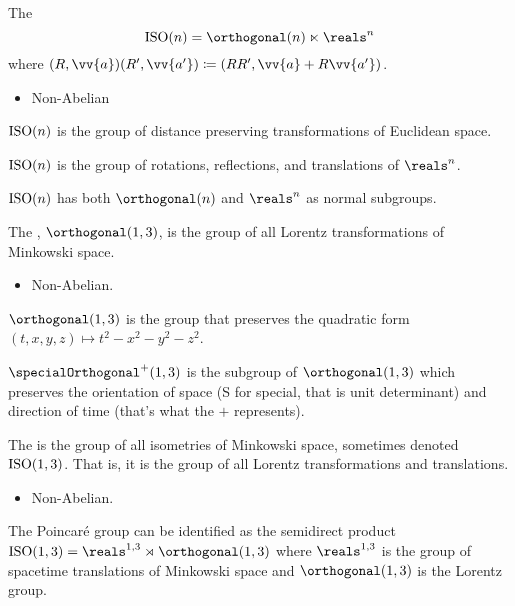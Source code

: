 \begin{dfn}{}{}
    The 
    \begin{equation}
        \ISO(n) = \orthogonal(n) \ltimes \reals^n
    \end{equation}
    where \((R, \vv{a}) (R', \vv{a'}) \coloneqq (RR', \vv{a} + R\vv{a'})\).
    \begin{multicols}{2}
        \begin{itemize}
            \item Non-Abelian
        \end{itemize}
    \end{multicols}
    \(\operatorname{ISO}(n)\) is the group of distance preserving transformations of Euclidean space.
    
    \(\operatorname{ISO}(n)\) is the group of rotations, reflections, and translations of \(\reals^n\).
    
    \(\operatorname{ISO}(n)\) has both \(\orthogonal(n)\) and \(\reals^n\) as normal subgroups.
\end{dfn}

\begin{dfn}{}{}
    The , \(\orthogonal(1, 3)\), is the group of all Lorentz transformations of Minkowski space.
    \begin{multicols}{2}
        \begin{itemize}
            \item Non-Abelian.
        \end{itemize}
    \end{multicols}

    \(\orthogonal(1, 3)\) is the group that preserves the quadratic form \((t, x, y, z) \mapsto t^2 - x^2 - y^2 - z^2\).
    
    \(\specialOrthogonal^+(1, 3)\) is the subgroup of \(\orthogonal(1, 3)\) which preserves the orientation of space (S for special, that is unit determinant) and direction of time (that's what the \(+\) represents).
\end{dfn}

\begin{dfn}{}{}
    The  is the group of all isometries of Minkowski space, sometimes denoted \(\operatorname{ISO}(1, 3)\).
    That is, it is the group of all Lorentz transformations and translations.
    \begin{multicols}{2}
        \begin{itemize}
            \item Non-Abelian.
        \end{itemize}
    \end{multicols}
    
    The Poincar\'e group can be identified as the semidirect product \(\isometry(1, 3) = \reals^{1,3} \rtimes  \orthogonal(1, 3)\) where \(\reals^{1,3}\) is the group of spacetime translations of Minkowski space and \(\orthogonal(1, 3)\) is the Lorentz group.
\end{dfn}
